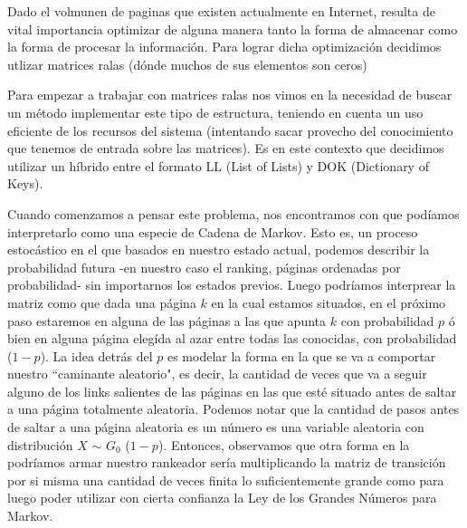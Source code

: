 \par Dado el volmunen de paginas que existen actualmente en Internet, resulta de vital importancia 
optimizar de alguna manera tanto la forma de almacenar
como la forma de procesar la informaci\'on. Para lograr dicha optimizaci\'on decidimos utlizar matrices ralas
 (d\'onde muchos de sus elementos son ceros)
\par Para empezar a trabajar con matrices ralas nos vimos en la necesidad de buscar un método implementar
 este tipo de estructura, teniendo en cuenta un uso eficiente de los recursos del sistema 
 (intentando sacar provecho del conocimiento que tenemos de entrada sobre las matrices). 
Es en este contexto que decidimos utilizar un h\'ibrido entre el formato LL (List of Lists) y 
DOK (Dictionary of Keys).


Cuando comenzamos a pensar este problema, nos encontramos con que pod\'iamos interpretarlo como una especie de Cadena de Markov. Esto es, un proceso estoc\'astico en el que basados en nuestro estado actual, podemos describir la probabilidad futura -en nuestro caso el ranking, p\'aginas ordenadas por probabilidad- sin importarnos los estados previos.
Luego podr\'iamos interprear la matriz \label{eq:desarrollada} como que dada una p\'agina $k$ en la cual estamos situados, en el pr\'oximo paso estaremos en alguna de las p\'aginas a las que apunta $k$ con probabilidad $p$ \'o bien en alguna p\'agina eleg\'ida al azar entre todas las conocidas, con probabilidad ($1-p$).
La idea detr\'as del $p$ es modelar la forma en la que se va a comportar nuestro ``caminante aleatorio", es decir, la cantidad de veces que va a seguir alguno de los links salientes de las p\'aginas en las que est\'e situado antes de saltar a una p\'agina totalmente aleatoria.
Podemos notar que la cantidad de pasos antes de saltar a una p\'agina aleatoria es un n\'umero es una variable aleatoria con distribuci\'on         $X$ $\sim$ $G_0$ ($1-p$).\newline
Entonces, observamos que otra forma en la podr\'iamos armar nuestro rankeador ser\'ia multiplicando la matriz de transici\'on por si misma una cantidad de veces finita lo suficientemente grande como para luego poder utilizar con cierta confianza la Ley de los Grandes N\'umeros para Markov.
